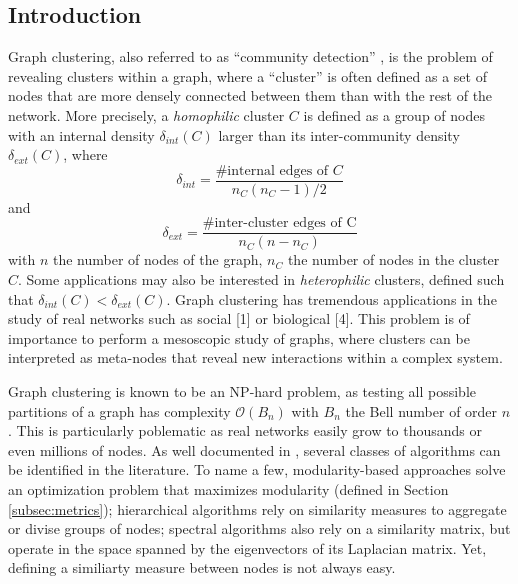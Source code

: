\documentclass[switch, 12pt]{article}
\renewcommand{\O}{\mathcal{O}}
\begin{document}
\begin{multicols}{2}

    \section{Introduction}

    Graph clustering, also referred to as ``community detection'' \cite{fortunato_community_2010}, is the problem of revealing clusters within a graph, where a ``cluster'' is often defined as a set of nodes that are more densely connected between them than with the rest of the network.
    More precisely, a \emph{homophilic} cluster $C$ is defined as a group of nodes with an internal density $\delta_{int}(C)$ larger than its inter-community density $\delta_{ext}(C)$, where
    \begin{equation}
        \delta_{int} = \frac{\text{\# internal edges of }C}{n_C (n_C - 1) / 2}
    \end{equation}
    and
    \begin{equation}
        \delta_{ext} = \frac{\text{\# inter-cluster edges of C}}{n_C (n - n_C)}
    \end{equation}
    with $n$ the number of nodes of the graph, $n_C$ the number of nodes in the cluster $C$.
    Some applications may also be interested in \emph{heterophilic} clusters, defined such that $\delta_{int}(C) < \delta_{ext}(C)$.
    Graph clustering has tremendous applications in the study of real networks such as
    social [1] or biological [4]. This problem is of importance to perform a mesoscopic study of graphs, where clusters can be interpreted as meta-nodes that reveal new interactions  within a complex system.


    Graph clustering is known to be an NP-hard problem, as testing all possible partitions of a graph has complexity $\O(B_n)$ with $B_n$ the Bell number of order $n$. This is particularly poblematic as real networks easily grow to thousands or even millions of nodes. As well documented in \cite{fortunato_community_2010}, several classes of algorithms can be identified in the literature. To name a few, modularity-based approaches solve an optimization problem that maximizes modularity (defined in Section \ref{subsec:metrics}); hierarchical algorithms rely on similarity measures to aggregate or divise groups of nodes; spectral algorithms also rely on a similarity matrix, but operate in the space spanned by the eigenvectors of its Laplacian matrix. Yet, defining a similiarty measure between nodes is not always easy.


\end{multicols}
\end{document}
